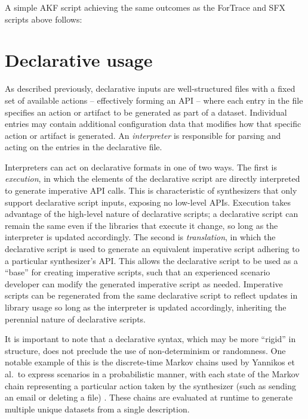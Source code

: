 \documentclass[letterpaper,12pt]{report}
\begin{document}
A simple AKF script achieving the same outcomes as the ForTrace and SFX
scripts above follows:

\section{Declarative usage}\label{declarative-usage}

As described previously, declarative inputs are well-structured files
with a fixed set of available actions -- effectively forming an API --
where each entry in the file specifies an action or artifact to be
generated as part of a dataset. Individual entries may contain
additional configuration data that modifies how that specific action or
artifact is generated. An \emph{interpreter} is responsible for parsing
and acting on the entries in the declarative file.

Interpreters can act on declarative formats in one of two ways. The
first is \emph{execution}, in which the elements of the declarative
script are directly interpreted to generate imperative API calls. This
is characteristic of synthesizers that only support declarative script
inputs, exposing no low-level APIs. Execution takes advantage of the
high-level nature of declarative scripts; a declarative script can
remain the same even if the libraries that execute it change, so long as
the interpreter is updated accordingly. The second is
\emph{translation}, in which the declarative script is used to generate
an equivalent imperative script adhering to a particular synthesizer's
API. This allows the declarative script to be used as a ``base'' for
creating imperative scripts, such that an experienced scenario developer
can modify the generated imperative script as needed. Imperative scripts
can be regenerated from the same declarative script to reflect updates
in library usage so long as the interpreter is updated accordingly,
inheriting the perennial nature of declarative scripts.

It is important to note that a declarative syntax, which may be more
``rigid'' in structure, does not preclude the use of non-determinism or
randomness. One notable example of this is the discrete-time Markov
chains used by Yannikos et al.~to express scenarios in a probabilistic
manner, with each state of the Markov chain representing a particular
action taken by the synthesizer (such as sending an email or deleting a
file) \cite{yannikosDataCorporaDigital2014}. These chains are
evaluated at runtime to generate multiple unique datasets from a single
description.
\end{document}
